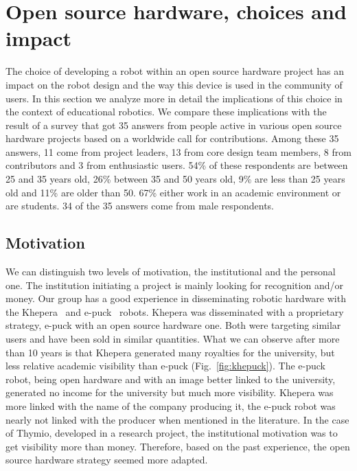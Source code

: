 \documentclass[letterpaper, 10 pt, conference]{ieeeconf}  %
\begin{document}
\section{Open source hardware, choices and impact}

The choice of developing a robot within an open source hardware project has an impact on the robot design and the way this device is used in the community of users. 
In this section we analyze more in detail the implications of this choice in the context of educational robotics.
We compare these implications with the result of a survey that got 35 answers from people active in various open source hardware projects based on a worldwide call for contributions. 
Among these 35 answers, 11 come from project leaders, 13 from core design team members, 8 from contributors and 3 from enthusiastic users.
54\% of these respondents are between 25 and 35 years old, 26\% between 35 and 50 years old, 9\% are less than 25 years old and 11\% are older than 50.  
67\% either work in an academic environment or are students. 
34 of the 35 answers come from male respondents.

\subsection{Motivation}

We can distinguish two levels of motivation, the institutional and the personal one.
The institution initiating a project is mainly looking for recognition and/or money. 
Our group has a good experience in disseminating robotic hardware with the Khepera~\cite{MonFraIen93} and e-puck~\cite{mondada2009puck} robots.
Khepera was disseminated with a proprietary strategy, e-puck with an open source hardware one.
Both were targeting similar users and have been sold in similar quantities.
What we can observe after more than 10 years is that Khepera generated many royalties for the university, but less relative academic visibility than e-puck (Fig.~\ref{fig:khepuck}).
The e-puck robot, being open hardware and with an image better linked to the university, generated no income for the university but much more visibility.
Khepera was more linked with the name of the company producing it, the e-puck robot was nearly not linked with the producer when mentioned in the literature.
In the case of Thymio, developed in a research project, the institutional motivation was to get visibility more than money. 
Therefore, based on the past experience, the open source hardware strategy seemed more adapted.
\end{document}
